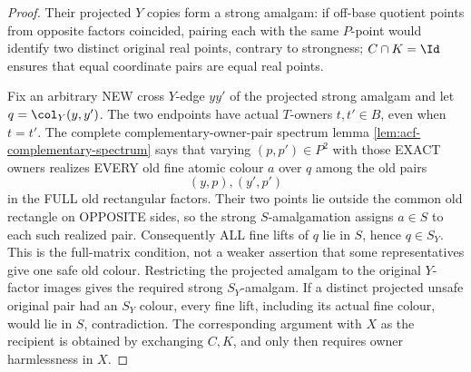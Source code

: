 \begin{proof}
Their projected $Y$ copies form a strong amalgam:
if off-base quotient points from opposite factors
coincided, pairing each with the same $P$-point would
identify two distinct original real points, contrary to
strongness; $C\cap K=\Id$ ensures that equal coordinate
pairs are equal real points.

Fix an arbitrary NEW cross \(Y\)-edge
\(yy'\) of the projected strong amalgam
and let \(q=\col_Y(y,y')\).
The two endpoints have actual \(T\)-owners
\(t,t'\in B\), even when \(t=t'\).
The complete complementary-owner-pair
spectrum lemma
\cref{lem:acf-complementary-spectrum}
says that varying \((p,p')\in P^2\)
with those EXACT owners realizes
EVERY old fine atomic colour \(a\)
over \(q\) among the old pairs
\[
                    (y,p),(y',p')
\]
in the FULL old rectangular factors.
Their two points lie outside the
common old rectangle on OPPOSITE
sides, so the strong \(S\)-amalgamation
assigns \(a\in S\) to each such
realized pair. Consequently ALL
fine lifts of \(q\) lie in \(S\),
hence \(q\in S_Y\).
This is the full-matrix condition,
not a weaker assertion that some
representatives give one safe
old colour. Restricting the
projected amalgam to the original
\(Y\)-factor images gives the
required strong \(S_Y\)-amalgam.  If a distinct projected unsafe
original pair had an $S_Y$ colour, every fine lift, including
its actual fine colour, would lie in $S$, contradiction.
The corresponding argument with $X$ as the recipient is obtained
by exchanging $C,K$, and only then requires owner harmlessness
in $X$.
\end{proof}

